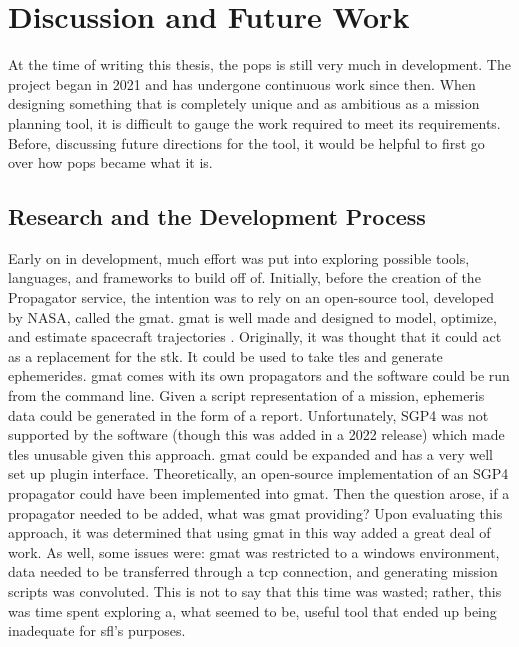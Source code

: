 \glsresetall{} 

\chapter{Discussion and Future Work}\label{chap:discussion}

\lettrine[lines=2, findent=0pt, nindent=5pt]{A}{}t the time of writing this
thesis, the \gls{pops} is still very much in development. The project began in
2021 and has undergone continuous work since then. When designing something that
is completely unique and as ambitious as a mission planning tool, it is
difficult to gauge the work required to meet its requirements. Before,
discussing future directions for the tool, it would be helpful to first go over
how \gls{pops} became what it is. 

\section{Research and the Development Process}

Early on in development, much effort was put into exploring possible tools,
languages, and frameworks to build off of. Initially, before the creation of
the Propagator service, the intention was to rely on an open-source tool,
developed by NASA, called the \gls{gmat}. \gls{gmat} is well made and designed
to model, optimize, and estimate spacecraft trajectories
\cite{hughes_using_2017}.  Originally, it was thought that it could act as a
replacement for the \gls{stk}. It could be used to take \glspl{tle} and
generate ephemerides.  \gls{gmat} comes with its own propagators and the
software could be run from the command line. Given a script representation of a
mission, ephemeris data could be generated in the form of a report.
Unfortunately, SGP4 was not supported by the software (though this was added in
a 2022 release) which made \glspl{tle} unusable given this approach.
\gls{gmat} could be expanded and has a very well set up plugin interface.
Theoretically, an open-source implementation of an SGP4 propagator could have
been implemented into \gls{gmat}.  Then the question arose, if a propagator
needed to be added, what was \gls{gmat} providing?  Upon evaluating this
approach, it was determined that using \gls{gmat} in this way added a great
deal of work. As well, some issues were: \gls{gmat} was restricted to a windows
environment, data needed to be transferred through a \gls{tcp} connection, and
generating mission scripts was convoluted. This is not to say that this time
was wasted; rather, this was time spent exploring a, what seemed to be, useful
tool that ended up being inadequate for \gls{sfl}'s purposes. 

